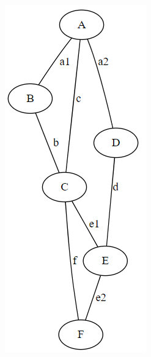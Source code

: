 \begin{figure}[H]
  \centering
  \begin{minipage}[b]{0.3\textwidth}
    \includegraphics[width=\textwidth]{imgs/graph_g.PNG}

\end{minipage}
\end{figure}
